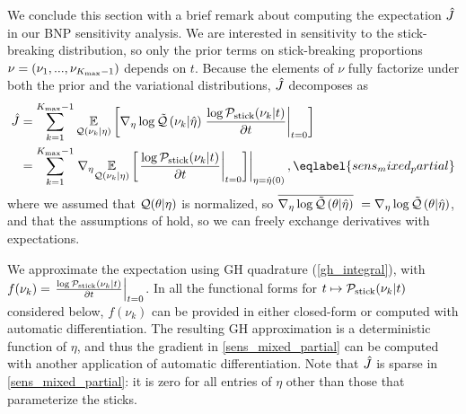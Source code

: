 
We conclude this section with a brief remark about computing the expectation
$\hat J$ in our BNP sensitivity analysis.
We are interested in sensitivity to the stick-breaking distribution,
so only the prior terms on stick-breaking proportions
$\nu = (\nu_1, ..., \nu_{{K_{\mathrm{max}}} - 1})$ depends on $t$.
Because the elements of $\nu$ fully factorize
under both the prior and the variational distributions,
$\hat J$ decomposes as
\begin{align}
  \crosshessian &=
  \sum_{\k=1}^{\kmax - 1}
          \expect{\q(\nuk \vert \eta)}
                 {
                 \lqgrad{\nuk \vert \etaopt}
                 \fracat{\log \pstick(\nuk \vert \t)}{\partial \t}{\t = 0}
                 } \notag\\
  &= \sum_{\k=1}^{\kmax - 1}
         \evalat{\nabla_\eta \expect{\q(\nuk \vert \eta)}
                {
                \fracat{\log \pstick(\nuk \vert \t)}{\partial \t}{\t = 0}
                }}{\eta = \etaopt(0)},
\eqlabel{sens_mixed_partial}
\end{align}
where we assumed that $\mathcal{Q}(\theta \vert \eta)$ is normalized, so
$\overline{{\nabla_\eta \log \tilde{\mathcal{Q}}}\left(\theta \vert \hat\eta\right)}\,\, = {\nabla_\eta \log \tilde{\mathcal{Q}}}\left(\theta \vert \hat\eta\right)$,
and that the assumptions of  hold, so we
can freely exchange derivatives with expectations.

We approximate the expectation using GH quadrature (\eqref{gh_integral}),
with
$f(\nu_k) = \left.\frac{\log \mathcal{P}_{\mathrm{stick}}(\nu_{k} \vert t)}{\partial t}\right\vert_{t = 0}$.
In all the functional forms for
$t \mapsto \mathcal{P}_{\mathrm{stick}}(\nu_{k} \vert t)$ considered below,
$f(\nu_k)$ can be provided in either closed-form or computed with automatic differentiation.
The resulting GH approximation is a deterministic function of $\eta$,
and thus the gradient in \eqref{sens_mixed_partial} can be computed
with another application of automatic differentiation.
Note that $\hat J$ is sparse in \eqref{sens_mixed_partial}:
it is zero for all entries of
$\eta$ other than those that parameterize the sticks.
